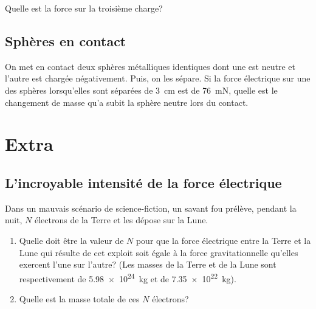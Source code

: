 \documentclass[nofonts]{tufte-handout}
\begin{document}
Quelle est la force sur la troisième charge?


\subsection{Sphères en contact}

On met en contact deux sphères métalliques identiques dont une est neutre et
l'autre est chargée négativement.
Puis, on les sépare. Si la force électrique sur une des sphères lorsqu'elles
sont séparées de \qty{3}{\centi\meter} est de \qty{76}{\milli\newton}, quelle
est le changement de masse qu'a subit la sphère neutre lors du contact.

\section{Extra}

\subsection{L'incroyable intensité de la force électrique}

Dans un mauvais scénario de science-fiction, un savant fou prélève, pendant la
nuit, $N$ électrons de la Terre et les dépose sur la Lune.
\begin{enumerate}[label=\alph*)]
  \item Quelle doit être
    la valeur de $N$ pour que la force électrique entre la Terre et la Lune qui
    résulte de cet exploit soit égale à la force gravitationnelle qu'elles exercent
    l'une sur l'autre? (Les masses de la Terre et de la Lune sont respectivement de
    \qty{5.98e24}{kg} et de \qty{7.35e22}{kg}).
  \item Quelle est la masse totale de ces
    $N$ électrons?
\end{enumerate}






\end{document}
